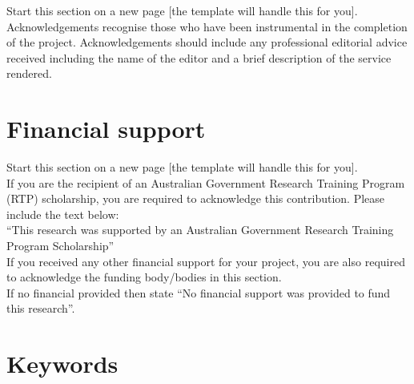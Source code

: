 \begin{instructional}
    Start this section on a new page [the template will handle this for you].\\
    
    \noindent
    Acknowledgements recognise those who have been instrumental in the completion of the project.  Acknowledgements should include any professional editorial advice received including the name of the editor and a brief description of the service rendered.
\end{instructional}





\clearpage
\section*{Financial support}

\begin{instructional}
    Start this section on a new page [the template will handle this for you].\\
    
    \noindent
    If you are the recipient of an Australian Government Research Training Program (RTP) scholarship, you are required to acknowledge this contribution.  Please include the text below:\\
    
    \noindent
    ``This research was supported by an Australian Government Research Training Program Scholarship''\\
    
    \noindent
    If you received any other financial support for your project, you are also required to acknowledge the funding body/bodies in this section.\\
    
    \noindent
    If no financial provided then state ``No financial support was provided to fund this research''.
\end{instructional}





\section*{Keywords}

